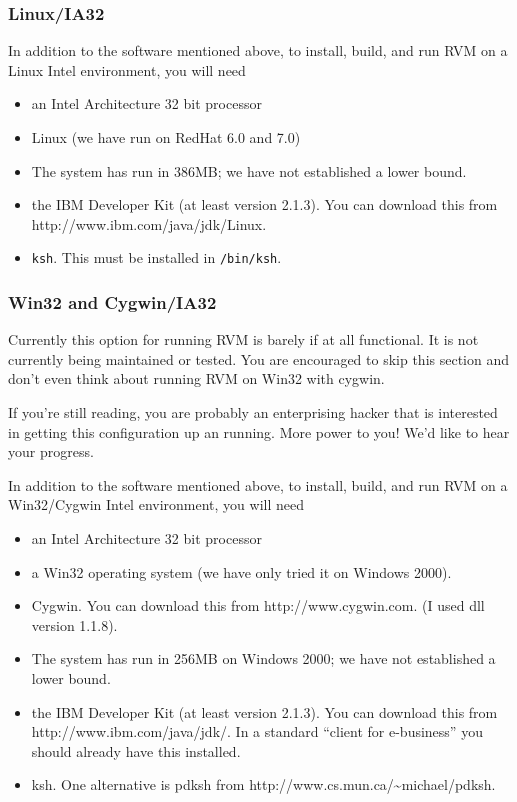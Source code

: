 \subsubsection{Linux/IA32}
In addition to the software mentioned above, to install, build, and
run RVM on a Linux Intel environment, you will need 
\begin{itemize}
\item an Intel Architecture 32 bit processor
\item Linux  (we have run on RedHat 6.0 and 7.0)
\item The system has run in 386MB; we have not established a lower bound.
\item the IBM Developer Kit (at least version 2.1.3).  You can download this from
           {http://www.ibm.com/java/jdk/Linux}.
\item {\tt ksh}. This must be installed in {\tt /bin/ksh}.
\end{itemize}

\subsubsection{Win32 and Cygwin/IA32}
Currently this option for running RVM is barely if at all functional.
It is not currently being maintained or tested. You are encouraged to 
skip this section and don't even think about running RVM on Win32 with 
cygwin.

If you're still reading, you are probably an enterprising hacker that is
interested in getting this configuration up an running.  More power to
you! We'd like to hear your progress.

In addition to the software mentioned above, to install, build, and
run RVM on a Win32/Cygwin Intel environment, you will need 
\begin{itemize}
\item an Intel Architecture 32 bit processor
\item a Win32 operating system (we have only tried it on Windows 2000).
\item Cygwin. You can download this from 
           {http://www.cygwin.com}. (I used dll version 1.1.8).
\item The system has run in 256MB on Windows 2000; we have not established
a lower bound.
\item the IBM Developer Kit (at least version 2.1.3).  You can download this from
           {http://www.ibm.com/java/jdk/}.
In a standard ``client for e-business'' you should already have this
installed.
\item ksh.  One alternative is pdksh from 
       {http://www.cs.mun.ca/\~{}michael/pdksh}.
\end{itemize}

